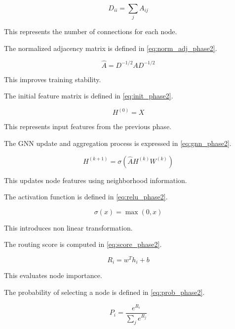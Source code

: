 \documentclass[a4paper,fleqn]{cas-dc}
\numberwithin{equation}{section}
\begin{document}
\begin{equation}
D_{ii} = \sum_j A_{ij}
\label{eq:degree_phase2}
\end{equation}

This represents the number of connections for each node.

The normalized adjacency matrix is defined in \ref{eq:norm_adj_phase2}.

\begin{equation}
\hat{A} = D^{-1/2} A D^{-1/2}
\label{eq:norm_adj_phase2}
\end{equation}

This improves training stability.

The initial feature matrix is defined in \ref{eq:init_phase2}.

\begin{equation}
H^{(0)} = X
\label{eq:init_phase2}
\end{equation}

This represents input features from the previous phase.

The GNN update and aggregation process is expressed in \ref{eq:gnn_phase2}.

\begin{equation}
H^{(k+1)} = \sigma \left( \hat{A} H^{(k)} W^{(k)} \right)
\label{eq:gnn_phase2}
\end{equation}

This updates node features using neighborhood information.

The activation function is defined in \ref{eq:relu_phase2}.

\begin{equation}
\sigma(x) = \max(0, x)
\label{eq:relu_phase2}
\end{equation}

This introduces non linear transformation.

The routing score is computed in \ref{eq:score_phase2}.

\begin{equation}
R_i = w^T h_i + b
\label{eq:score_phase2}
\end{equation}

This evaluates node importance.

The probability of selecting a node is defined in \ref{eq:prob_phase2}.

\begin{equation}
P_i = \frac{e^{R_i}}{\sum_j e^{R_j}}
\label{eq:prob_phase2}
\end{equation}
\end{document}
